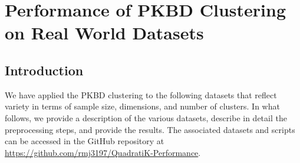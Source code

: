 \documentclass{article}
\begin{document}
\section{Performance of PKBD Clustering on Real World Datasets}

\subsection*{Introduction}

We have applied the PKBD clustering to the following datasets that reflect variety in terms of sample size, dimensions, and number of clusters. In what follows, we provide a description of the various datasets, describe in detail the preprocessing steps, and provide the results. The associated datasets and scripts can be accessed in the GitHub repository at \url{https://github.com/rmj3197/QuadratiK-Performance}. 
\end{document}
